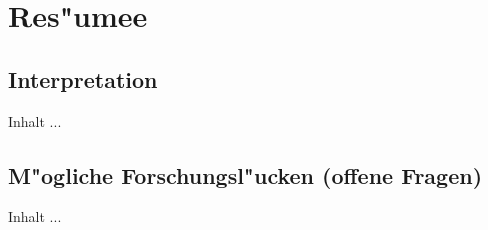 
\chapter{Res"umee}
\minitoc 


\section{Interpretation}
Inhalt ...


\section{M"ogliche Forschungsl"ucken (offene Fragen)}
Inhalt ...



